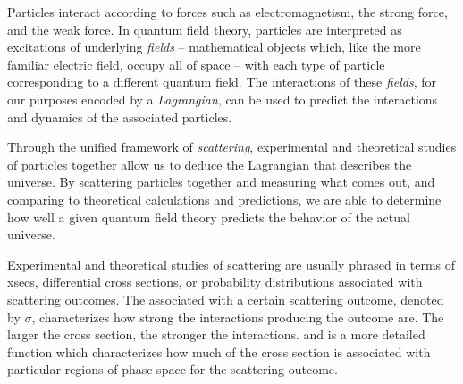 

Particles interact according to forces such as electromagnetism, the strong force, and the weak force.
%
In quantum field theory, particles are interpreted as excitations of underlying \textit{fields} -- mathematical objects which, like the more familiar electric field, occupy all of space -- with each type of particle corresponding to a different quantum field.
%
The interactions of these \textit{fields}, for our purposes encoded by a \textit{Lagrangian}, can be used to predict the interactions and dynamics of the associated particles.

Through the unified framework of \textit{scattering}, experimental and theoretical studies of particles together allow us to deduce the Lagrangian that describes the universe.
%
By scattering particles together and measuring what comes out, and comparing to theoretical calculations and predictions, we are able to determine how well a given quantum field theory predicts the behavior of the actual universe.

Experimental and theoretical studies of scattering are usually phrased in terms of \glspl{xsec}, differential cross sections, or probability distributions associated with scattering outcomes.
%
The  associated with a certain scattering outcome, denoted by \(\sigma\), characterizes how strong the interactions producing the outcome are.
%
The larger the cross section, the stronger the interactions.
%
 and  is a more detailed function which characterizes how much of the cross section is associated with particular regions of phase space for the scattering outcome.


